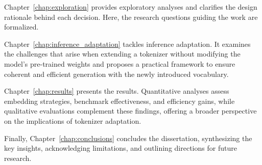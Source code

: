 Chapter~\ref{chap:exploration} provides exploratory analyses and clarifies the design rationale behind each decision. Here, the research questions guiding the work are formalized.

Chapter~\ref{chap:inference_adaptation} tackles inference adaptation. It examines the challenges that arise when extending a tokenizer without modifying the model’s pre-trained weights and proposes a practical framework to ensure coherent and efficient generation with the newly introduced vocabulary.

Chapter~\ref{chap:results} presents the results. Quantitative analyses assess embedding strategies, benchmark effectiveness, and efficiency gains, while qualitative evaluations complement these findings, offering a broader perspective on the implications of tokenizer adaptation.

Finally, Chapter~\ref{chap:conclusions} concludes the dissertation, synthesizing the key insights, acknowledging limitations, and outlining directions for future research.